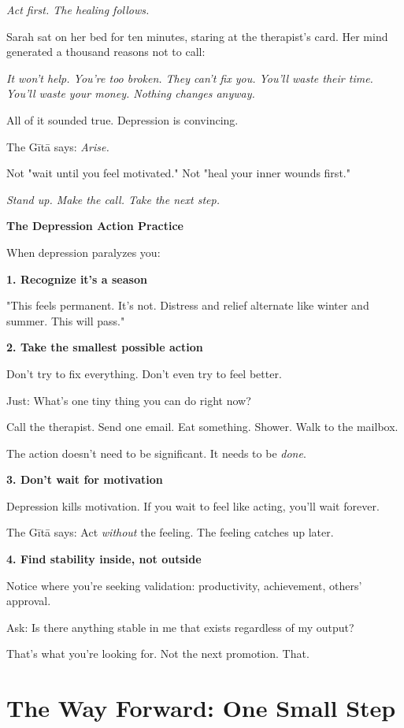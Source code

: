 \documentclass[11pt,twoside]{book}
\begin{document}
\textit{Act first. The healing follows.}

Sarah sat on her bed for ten minutes, staring at the therapist's card. Her mind generated a thousand reasons not to call:

\textit{It won't help. You're too broken. They can't fix you. You'll waste their time. You'll waste your money. Nothing changes anyway.}

All of it sounded true. Depression is convincing.

The Gītā says: \textit{Arise.}

Not "wait until you feel motivated." Not "heal your inner wounds first."

\textit{Stand up. Make the call. Take the next step.}

\begin{practicebox}
\textbf{The Depression Action Practice}

When depression paralyzes you:

\textbf{1. Recognize it's a season}

"This feels permanent. It's not. Distress and relief alternate like winter and summer. This will pass."

\textbf{2. Take the smallest possible action}

Don't try to fix everything. Don't even try to feel better.

Just: What's one tiny thing you can do right now?

Call the therapist. Send one email. Eat something. Shower. Walk to the mailbox.

The action doesn't need to be significant. It needs to be \textit{done}.

\textbf{3. Don't wait for motivation}

Depression kills motivation. If you wait to feel like acting, you'll wait forever.

The Gītā says: Act \textit{without} the feeling. The feeling catches up later.

\textbf{4. Find stability inside, not outside}

Notice where you're seeking validation: productivity, achievement, others' approval.

Ask: Is there anything stable in me that exists regardless of my output?

That's what you're looking for. Not the next promotion. That.
\end{practicebox}

\section*{The Way Forward: One Small Step}
\end{document}

